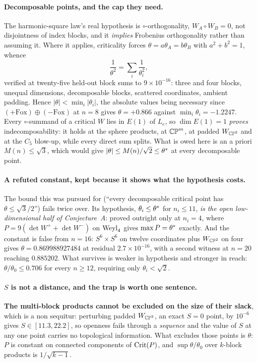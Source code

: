 \paragraph{Decomposable points, and the cap they need.} The harmonic-square law's real hypothesis is $\circ$-orthogonality, $W_A\circ W_B=0$, not disjointness of index blocks, and it \emph{implies} Frobenius orthogonality rather than assuming it. Where it applies, criticality forces $\theta=a\theta_A=b\theta_B$ with $a^2+b^2=1$, whence
\[
\frac1{\theta^2}=\sum_i\frac1{\theta_i^2},
\]
verified at twenty-five held-out block sums to $9\times10^{-16}$: three and four blocks, unequal dimensions, decomposable blocks, scattered coordinates, ambient padding. Hence $|\theta|<\min_i|\theta_i|$, the absolute values being necessary since $(+\mathrm{Fox})\oplus(-\mathrm{Fox})$ at $n=8$ gives $\theta=+0.866$ against $\min_i\theta_i=-1.2247$. Every $\circ$-summand of a critical $W$ lies in $E(1)$ of $L_e$, so $\dim E(1)=1$ \emph{proves} indecomposability: it holds at the sphere products, at $\mathbb{CP}^m$, at padded $W_{\mathbb{CP}^2}$ and at the $C_5$ blow-up, while every direct sum splits. What is owed here is an a priori $M(n)\le\sqrt3$, which would give $|\theta|\le M(n)/\sqrt2\le\theta^{*}$ at every decomposable point.

\paragraph{A refuted constant, kept because it shows what the hypothesis costs.} The bound this was pursued for (``every decomposable critical point has $\theta\le\sqrt3/2$'') fails twice over. Its hypothesis, $\theta_i\le\theta^{*}$ for $n_i\le11$, \emph{is the open low-dimensional half of Conjecture~A}: proved outright only at $n_i=4$, where $P=9(\det W^++\det W^-)$ on $\mathrm{Weyl}_4$ gives $\max P=\theta^{*}$ exactly. And the constant is false from $n=16$: $S^6\times S^6$ on twelve coordinates plus $W_{\mathbb{CP}^2}$ on four gives $\theta=0.869988927484$ at residual $2.7\times10^{-16}$, with a second witness at $n=20$ reaching $0.885202$. What survives is weaker in hypothesis and stronger in reach: $\theta/\theta_0\le0.706$ for every $n\ge12$, requiring only $\theta_i<\sqrt2$.

\paragraph{$S$ is not a distance, and the trap is worth one sentence.} \textbf{The multi-block products cannot be excluded on the size of their slack}, which is a non sequitur: perturbing padded $W_{\mathbb{CP}^2}$, an exact $S=0$ point, by $10^{-6}$ gives $S\in[11.3,22.2]$, so openness fails through a \emph{sequence} and the value of $S$ at any one point carries no topological information. What excludes those points is $\theta$: $P$ is constant on connected components of $\mathrm{Crit}(P)$, and $\sup\theta/\theta_0$ over $k$-block products is $1/\sqrt{k-1}$.

